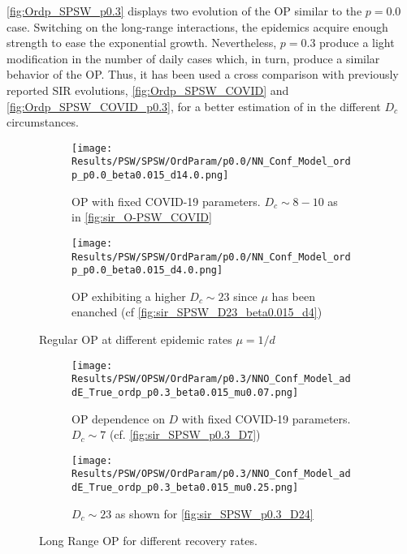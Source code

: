 \documentclass[a4paper,10pt,twoside]{book} %
\theoremstyle{definition}
\begin{document}
\autoref{fig:Ordp_SPSW_p0.3} displays two evolution of the OP similar to the $p = 0.0$ case.
Switching on the long-range interactions, the epidemics acquire enough strength to ease the exponential growth. Nevertheless, $p = 0.3$ produce a light modification in the number of daily cases which, in turn, produce a similar behavior of the OP. Thus, it has been used a cross comparison with previously reported SIR evolutions, \autoref{fig:Ordp_SPSW_COVID} and \autoref{fig:Ordp_SPSW_COVID_p0.3}, for a better estimation of in the different $D_c$ circumstances.
\begin{figure}[t]
	\begin{subfigure}{0.48\linewidth}
		\centering
		\texttt{[image: Results/PSW/SPSW/OrdParam/p0.0/NN\_Conf\_Model\_ordp\_p0.0\_beta0.015\_d14.0.png]} 
		\caption{OP with fixed COVID-19 parameters. \newline $D_c \sim 8-10$ as in \autoref{fig:sir_O-PSW_COVID}}
		\label{fig:Ordp_SPSW_COVID-19_d14}
	\end{subfigure}
	\begin{subfigure}{0.48\linewidth}
		\centering
		\texttt{[image: Results/PSW/SPSW/OrdParam/p0.0/NN\_Conf\_Model\_ordp\_p0.0\_beta0.015\_d4.0.png]}
		\caption{OP exhibiting a higher $D_c \sim 23$ since $\mu$ has been enanched (cf \autoref{fig:sir_SPSW_D23_beta0.015_d4})}
		\label{fig:Ordp_SPSW_d1.0_COVID19}
	\end{subfigure}
	\caption{Regular OP at different epidemic rates $\mu = 1/d$}
	\label{fig:Ordp_SPSW_COVID}
\end{figure}

\begin{figure}[t]
	\begin{subfigure}{0.48\linewidth}
		\texttt{[image: Results/PSW/OPSW/OrdParam/p0.3/NNO\_Conf\_Model\_addE\_True\_ordp\_p0.3\_beta0.015\_mu0.07.png]}
		\caption{OP dependence on $D$ with fixed COVID-19 parameters. $D_c \sim 7$ \cite{Thurner::NetBasedExpl} (cf. \autoref{fig:sir_SPSW_p0.3_D7})}
		\label{fig:Ordp_SPSW_p0.3}
	\end{subfigure}
	\begin{subfigure}{0.48\linewidth}
		\texttt{[image: Results/PSW/OPSW/OrdParam/p0.3/NNO\_Conf\_Model\_addE\_True\_ordp\_p0.3\_beta0.015\_mu0.25.png]}
		\caption{$D_c \sim 23$ as shown for \autoref{fig:sir_SPSW_p0.3_D24}}
		\label{fig:Ordp_SPSW_d4_p0.3}
	\end{subfigure}
	\caption{Long Range OP for different recovery rates.}
	\label{fig:Ordp_SPSW_COVID_p0.3}
\end{figure}
\end{document}
